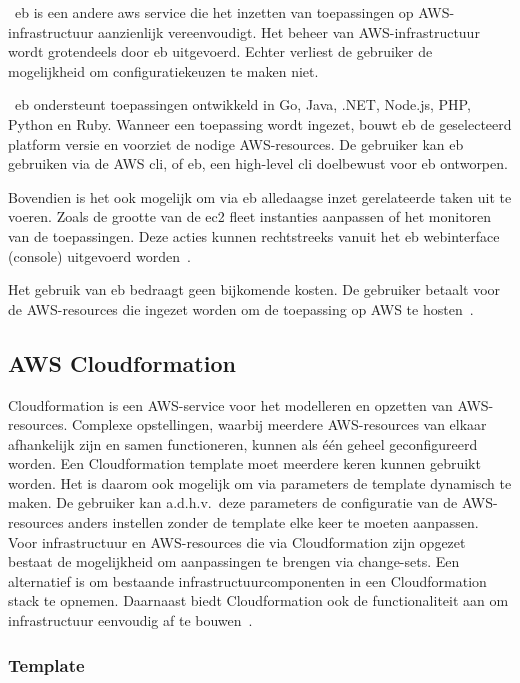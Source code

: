 ~\acrfull{eb} is een andere \acrshort{aws} service die het inzetten van toepassingen op AWS-infrastructuur aanzienlijk vereenvoudigt.
Het beheer van AWS-infrastructuur wordt grotendeels door \acrshort{eb} uitgevoerd.
Echter verliest de gebruiker de mogelijkheid om configuratiekeuzen te maken niet.

~\acrlong{eb} ondersteunt toepassingen ontwikkeld in Go, Java, .NET, Node.js, PHP, Python en Ruby.
Wanneer een toepassing wordt ingezet, bouwt \acrshort{eb} de geselecteerd platform versie en voorziet de nodige AWS-resources.
De gebruiker kan \acrlong{eb} gebruiken via de AWS \acrfull{cli}, of eb, een high-level \acrshort{cli} doelbewust voor \acrlong{eb} ontworpen.

Bovendien is het ook mogelijk om via \acrshort{eb} alledaagse inzet gerelateerde taken uit te voeren.
Zoals de grootte van de \acrshort{ec2} fleet instanties aanpassen of het monitoren van de toepassingen.
Deze acties kunnen rechtstreeks vanuit het \acrshort{eb} webinterface (console) uitgevoerd worden~\autocite{Khen2022a}.

Het gebruik van \acrlong{eb} bedraagt geen bijkomende kosten.
De gebruiker betaalt voor de AWS-resources die ingezet worden om de toepassing op AWS te hosten~\autocite{Khen2022a}.

\subsection{AWS Cloudformation}
\label{subsec:service-cloudformation}

Cloudformation is een AWS-service voor het modelleren en opzetten van AWS-resources.
Complexe opstellingen, waarbij meerdere AWS-resources van elkaar afhankelijk zijn en samen functioneren, kunnen als één geheel geconfigureerd worden.
Een Cloudformation template moet meerdere keren kunnen gebruikt worden.
Het is daarom ook mogelijk om via parameters de template dynamisch te maken.
De gebruiker kan a.d.h.v.\ deze parameters de configuratie van de AWS-resources anders instellen zonder de template elke keer te moeten aanpassen.
Voor infrastructuur en AWS-resources die via Cloudformation zijn opgezet bestaat de mogelijkheid om aanpassingen te brengen via change-sets.
Een alternatief is om bestaande infrastructuurcomponenten in een Cloudformation stack te opnemen.
Daarnaast biedt Cloudformation ook de functionaliteit aan om infrastructuur eenvoudig af te bouwen~\autocite{Mansoor2014}.

\subsubsection{Template}

